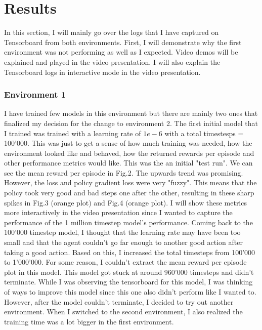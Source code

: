 \documentclass{article}
\numberwithin{equation}{section}
\numberwithin{equation}{section}
\begin{document}
\section*{Results}
In this section, I will mainly go over the logs that I have captured on Tensorboard from both environments. First, I will demonstrate why the first environment was not performing as well as I expected. Video demos will be explained and played in the video presentation. I will also explain the Tensorboard logs in interactive mode in the video presentation.

\subsubsection*{Environment 1}
I have trained few models in this environment but there are mainly two ones that finalized my decision for the change to environment 2. The first initial model that I trained was trained with a learning rate of $1e-6$ with a total timestesps = 100'000. This was just to get a sense of how much training was needed, how the environment looked like and behaved, how the returned rewards per episode and other performance metrics would like. This was the an initial "test run". We can see the mean reward per episode in Fig.2. The upwards trend was promising. However, the loss and policy gradient loss were very "fuzzy". This means that the policy took very good and bad steps one after the other, resulting in these sharp spikes in Fig.3 (orange plot) and Fig.4 (orange plot). I will show these metrics more interactively in the video presentation since I wanted to capture the performance of the 1 million timestep model's performance. Coming back to the 100'000 timestep model, I thought that the learning rate may have been too small and that the agent couldn't go far enough to another good action after taking a good action. Based on this, I increased the total timesteps from 100'000 to 1'000'000. For some reason, I couldn't extract the mean reward per episode plot in this model. This model got stuck at around 960'000 timesteps and didn't terminate. While I was observing the tensorboard for this model, I was thinking of ways to improve this model since this one also didn't perform like I wanted to. However, after the model couldn't terminate, I decided to try out another environment. When I switched to the second environment, I also realized the training time was a lot bigger in the first environment.  
\end{document}
